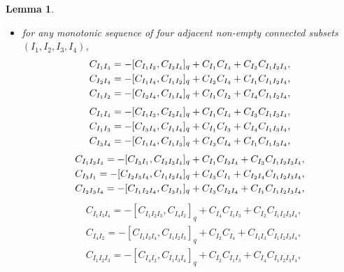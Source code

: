 \documentclass[pdftex]{sigma}
\numberwithin{equation}{section}
\newtheorem{lemm}[theo]{Lemma}
\theoremstyle{definition}
\begin{document}
\begin{lemm}
\begin{itemize}
\item for any monotonic sequence of four adjacent non-empty connected subsets $(I_1,I_2,I_3,I_4)$,%
\begin{subequations}\label{relaw4a}
\begin{align}
 & C_{I_1I_4}=-[C_{I_1I_2},C_{I_2I_4}]_q+ C_{I_1}C_{I_4}+C_{I_2}C_{I_1I_2I_4} ,\label{relaw43}\\
 & C_{I_2I_4}=-[C_{I_1I_4},C_{I_1I_2}]_q+ C_{I_2}C_{I_4}+C_{I_1}C_{I_1I_2I_4} ,\label{relaw46}\\
&C_{I_1I_2}=-[C_{I_2I_4},C_{I_1I_4}]_q+C_{I_1}C_{I_2}+C_{I_4}C_{I_1I_2I_4},\label{eq:2h3}
\end{align}\vspace{-1.1cm}
\end{subequations}
\begin{subequations}\label{relaw4b}
\begin{align}
 & C_{I_1I_4}=-[C_{I_1I_3},C_{I_3I_4}]_q+C_{I_1}C_{I_4}+C_{I_3}C_{I_1I_3I_4} ,\label{relaw41}\\
 & C_{I_1I_3}=-[C_{I_3I_4},C_{I_1I_4}]_q+ C_{I_1}C_{I_3}+C_{I_4}C_{I_1I_3I_4} ,\label{relaw45}\\
&C_{I_3I_4}=-[C_{I_1I_4},C_{I_1I_3}]_q+C_{I_3}C_{I_4}+C_{I_1}C_{I_1I_3I_4},\label{eq:2h2}
\end{align}\vspace{-1.1cm}
\end{subequations}
\begin{subequations}\label{relaw4c}
\begin{align}
 & C_{I_1I_2I_4}=-[C_{I_3I_1},C_{I_2I_3I_4}]_q+C_{I_1}C_{I_2I_4}+C_{I_3}C_{I_1I_2I_3I_4} ,\label{relaw47}\\
 &C_{I_3I_1}=-[C_{I_2I_3I_4},C_{I_1I_2I_4}]_q+C_{I_3}C_{I_1}+C_{I_2I_4}C_{I_1I_2I_3I_4} ,\label{relaw49}\\
&C_{I_2I_3I_4}=-[C_{I_1I_2I_4}, C_{I_3I_1}]_q +C_{I_3}C_{I_2I_4}+C_{I_1}C_{I_1I_2I_3I_4},\label{eq:2h4}
\end{align}\vspace{-1.1cm}
\end{subequations}
\begin{subequations}\label{relaw4d}
\begin{align}
 & C_{I_1I_3I_4}=-[C_{I_1I_2I_3},C_{I_4I_2}]_q+C_{I_4}C_{I_1I_3}+C_{I_2}C_{I_1I_2I_3I_4} , \label{relaw48} \\
 &C_{I_4I_2}=-[C_{I_1I_3I_4},C_{I_1I_2I_3}]_q+C_{I_2}C_{I_4}+C_{I_1I_3}C_{I_1I_2I_3I_4} ,\label{relaw410}\\
&C_{I_1I_2I_3}=-[C_{I_4I_2}, C_{I_1I_3I_4}]_q +C_{I_2}C_{I_1I_3}+C_{I_4}C_{I_1I_2I_3I_4},\label{eq:2h5}

\end{align}
\end{subequations}
\end{itemize}
\end{lemm}
\end{document}
